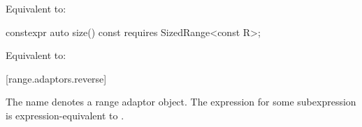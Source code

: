 \begin{addedblock}
\begin{itemdescr}
\pnum
\effects Equivalent to: 
\end{itemdescr}

%
\begin{itemdecl}
constexpr auto size() const requires SizedRange<const R>;
\end{itemdecl}

\begin{itemdescr}
\pnum
\effects Equivalent to: 
\end{itemdescr}

[range.adaptors.reverse]{}

\pnum
The name  denotes a
range adaptor object. The expression
 for some subexpression  is
expression-equivalent to .
\end{addedblock}
